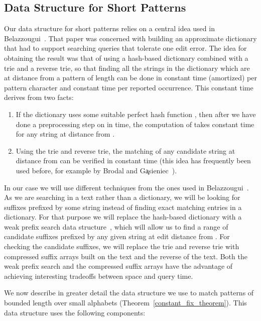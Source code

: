 \documentclass{article}
\newcommand{\?}{\mskip1.5mu}
\begin{document}
\subsection{Data Structure for Short Patterns}
\label{section:const_fix_data_struct}
Our data structure for short patterns relies on a central idea used in Belazzougui~\cite{B09}. That paper was concerned with building an approximate dictionary that had to support searching queries that tolerate one edit error. The idea for obtaining the result was that of using a hash-based dictionary combined with a trie and a reverse trie, so that finding all the strings in the dictionary which are at distance  from a pattern  of length  can be done in constant time (amortized) per pattern character and constant time per reported occurrence. This constant time derives from two facts:
\begin{enumerate}
\item If the dictionary uses some suitable perfect hash function , then after we have done a preprocessing step on  in  time, the computation of  takes constant time for any string  at distance  from . 
\item Using the trie and reverse trie, the matching of any candidate string  at distance  from  can be verified in constant time (this idea has frequently been used before, for example by Brodal and G{\c{a}}sieniec~\cite{BG96}). 
\end{enumerate}
In our case we will use different techniques from the ones used in Belazzougui~\cite{B09}. As we are searching in a text rather than a dictionary, we will be looking for suffixes prefixed by some string  instead of finding exact matching entries in a dictionary. For that purpose we will replace the hash-based dictionary with a weak prefix search data structure~\cite{BBPV10},  which will allow us to find a range of candidate suffixes prefixed by any given string  at edit distance  from . For checking the candidate suffixes, we will replace the trie and reverse trie with compressed suffix arrays built on the text and the reverse of the text. Both the weak prefix search and the compressed suffix arrays have the advantage of achieving interesting tradeoffs between space and query time. 

We now describe in greater detail the data structure we use to match patterns of bounded length over small alphabets (Theorem~\ref{constant_fix_theorem}). This data structure uses the following components:
\end{document}
